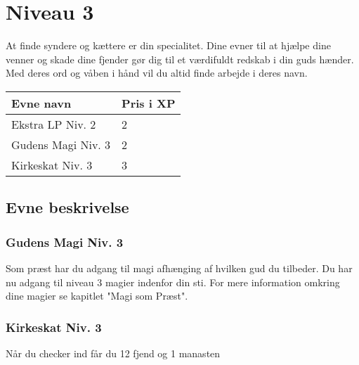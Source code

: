 \chapter*{Niveau 3}
At finde syndere og kættere er din specialitet. Dine evner til at hjælpe dine venner og skade dine fjender gør dig til et værdifuldt redskab i din guds hænder. Med deres ord og våben i hånd vil du altid finde arbejde i deres navn.

\begin{table}[H]
    \centering
    \begin{tabular}{|p{}|p{}|}
    \rowcolor{cerulean!80}\hline
        Evne navn & Pris i XP \\\hline
            Ekstra LP Niv. 2 & 2\\\hline
            Gudens Magi Niv. 3 & 2\\\hline
            Kirkeskat Niv. 3 & 3\\\hline
    \end{tabular}
\end{table}

\section*{Evne beskrivelse}



\subsection*{Gudens Magi Niv. 3}
Som præst har du adgang til magi afhænging af hvilken gud du tilbeder. Du har nu adgang til niveau 3 magier indenfor din sti. For mere information omkring dine magier se kapitlet "Magi som Præst".


\subsection*{Kirkeskat Niv. 3}
Når du checker ind får du 12 fjend og 1 manasten